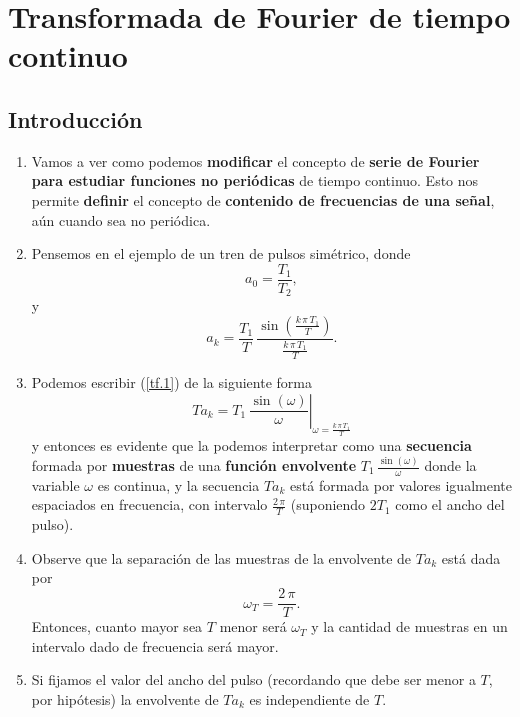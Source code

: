 \chapter{Transformada de Fourier de tiempo continuo}

\section{Introducción}

\begin{enumerate}
	
	\item Vamos a ver como podemos \textbf{modificar} el concepto de \textbf{serie de Fourier} \textbf{para estudiar funciones no periódicas} de tiempo continuo. Esto nos permite \textbf{definir} el concepto de \textbf{contenido de frecuencias de una señal}, aún cuando sea no periódica.
	
	\item Pensemos en el ejemplo de un tren de pulsos simétrico, donde
	\begin{equation}
		a_{0} = \frac{T_{1}}{T_{2}},
	\end{equation}
	y
	\begin{equation}
		a_{k} = \frac{T_{1}}{T} \, \frac{\sin\left(\frac{k \, \pi \, T_{1}}{T}\right)}{\frac{k \, \pi \, T_{1}}{T}}. \label{tf.1}
	\end{equation}
	
	\item Podemos escribir (\ref{tf.1}) de la siguiente forma
	\begin{equation}
		T a_{k} = \left. T_{1} \, \frac{\sin(\omega)}{\omega} \right|_{\omega = \frac{k \, \pi \, T_{1}}{T}}
	\end{equation}
	y entonces es evidente que la podemos interpretar como una \textbf{secuencia} formada por \textbf{muestras} de una \textbf{función envolvente} $T_{1} \, \frac{\sin(\omega)}{\omega}$ donde la variable $\omega$ es continua, y la secuencia $T a_{k}$ está formada por valores igualmente espaciados en frecuencia, con intervalo $\frac{2 \, \pi}{T}$ (suponiendo $2T_1$ como el ancho del pulso).
	
	\item Observe que la separación de las muestras de la envolvente de $T a_{k}$ está dada por 
	\begin{equation}
		\omega_{T} = \frac{2 \, \pi}{T}.
	\end{equation}
	Entonces, cuanto mayor sea $T$ menor será $\omega_{T}$ y la cantidad de muestras en un intervalo dado de frecuencia será mayor.
	
	\item Si fijamos el valor del ancho del pulso (recordando que debe ser menor a $T$, por hipótesis) la envolvente de $T a_{k}$ es independiente de $T$.
	
\end{enumerate}


